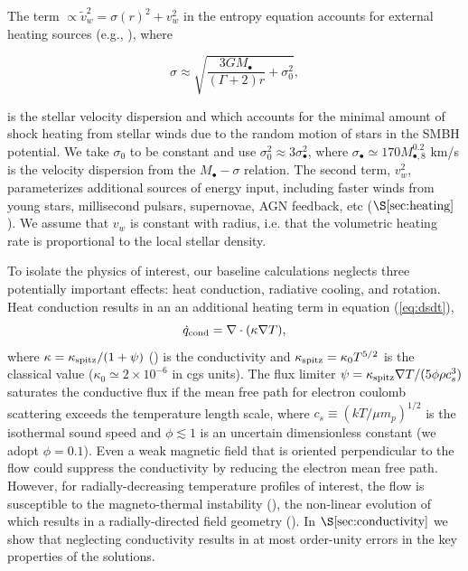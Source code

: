 \documentclass[usenatbib,fleqn]{mn2e}
\newcommand{\vw}{\tilde{v}_{w}}
\newcommand{\Mbh}[1][]{M_{\bullet#1}}
\newcommand{\Mbheight}{M_{\bullet,8}}
\begin{document}
The term $\propto \vw^2 = \sigma(r)^2+v_{w}^2$ in the entropy equation
accounts for external heating sources (e.g.,
\citealt{ShcherbakovWong+:2014a}), where

\begin{equation}
\sigma \approx \sqrt{\frac{3 G \Mbh}{(\Gamma+2)
    r}+\sigma_0^2},
\label{eq:sigmarel}
\end{equation}

is the stellar velocity dispersion and which accounts for the minimal
amount of shock heating from stellar winds due to the random motion of
stars in the SMBH potential. We take $\sigma_0$ to be constant and use
$\sigma_0^{2} \approx 3 \sigma_{\bullet}^2$, where
$\sigma_{\bullet}\simeq 170 \Mbheight^{0.2}$ km/s is the velocity
dispersion from the \citet{McConnellMa+:2011a} $\Mbh-\sigma$
relation.  The second term, $v_{w}^{2}$, parameterizes additional sources of
energy input, including faster winds from young stars, millisecond
pulsars, supernovae, AGN feedback, etc ($\S\ref{sec:heating}$).  We
assume that $v_w$ is constant with radius, i.e. that the volumetric
heating rate is proportional to the local stellar density.

To isolate the physics of interest, our baseline calculations
neglects three potentially important effects: heat conduction,
radiative cooling, and rotation.  Heat conduction results in
an an additional heating term in equation (\ref{eq:dsdt}),
\begin{equation}
\dot{q}_{\rm cond} = \nabla\cdot(\kappa \nabla T),
\label{eq:qdotcond}
 \end{equation}
 where $\kappa =\kappa_{\rm spitz}/(1+\psi)$
 (\citealt{DaltonBalbus:1993a}) is the conductivity and $\kappa_{\rm
   spitz} = \kappa_0 T^{5/2}$ is the classical \citet{Spitzer62} value
 ($\kappa_0\simeq 2\times 10^{-6}$ in cgs units).  The flux limiter
 $\psi = \kappa_{\rm spitz} \nabla T/(5\phi \rho c_s^3)$ saturates the
 conductive flux if the mean free path for electron coulomb scattering
 exceeds the temperature length scale, where $c_s \equiv (kT/\mu
 m_p)^{1/2}$ is the isothermal sound speed and $\phi \lesssim 1$ is an
 uncertain dimensionless constant (we adopt $\phi = 0.1$).  Even a
 weak magnetic field that is oriented perpendicular to the flow could
 suppress the conductivity by reducing the electron mean free path.
 However, for radially-decreasing temperature profiles of interest,
 the flow is susceptible to the magneto-thermal instability
 (\citealt{Balbus01}), the non-linear evolution of which results in a
 radially-directed field geometry (\citealt{Parrish&Stone07}).  In
 $\S\ref{sec:conductivity}$ we show that neglecting conductivity
 results in at most order-unity errors in the key properties of the
 solutions.
\end{document}
